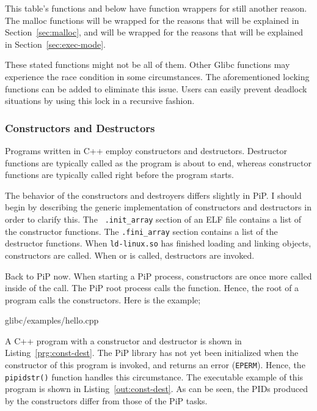 This table's functions  and below have
function wrappers for still another reason. The malloc functions will
be wrapped for the reasons that will be explained in
Section~\ref{sec:malloc}, and  will 
be wrapped for the reasons that will be explained in
Section~\ref{sec:exec-mode}. 

These stated functions might not be all of them. Other Glibc functions
may experience the race condition in some circumstances. The
aforementioned locking functions can be added to eliminate this
issue. Users can easily prevent deadlock situations by using this lock
in a recursive fashion.

\subsubsection{Constructors and Destructors}

Programs written in C++ employ constructors and
destructors. Destructor functions are typically called as the program
is about to end, whereas constructor functions are typically called
right before the program starts.  

The behavior of the constructors and destroyers differs slightly in
PiP. I should begin by describing the generic implementation of
constructors and destructors in order to clarify this. The {\tt
  .init_array} section of an ELF file contains a list of the
constructor functions. The {\tt .fini_array} section contains a list
of the destructor functions. When {\tt ld-linux.so} has finished
loading and linking objects, constructors are called. When
 or  is called, destructors are
invoked. 

Back to PiP now. When starting a PiP process, constructors are once
more called inside of the  call. The PiP root
process calls the  function. Hence, the root of a
program calls the constructors. Here is the example;

 {glibc/examples/hello.cpp}

A C++ program with a constructor and destructor is shown in
Listing~\ref{prg:const-dest}. The PiP library has not yet been
initialized when the constructor of this program is invoked, and
 returns an error ({\tt EPERM}). Hence, the
{\tt pipidstr()} function handles this circumstance. The 
executable example of this program is shown in
Listing~\ref{out:const-dest}. As can be seen, the PIDs produced by the
constructors differ from those of the PiP tasks.

